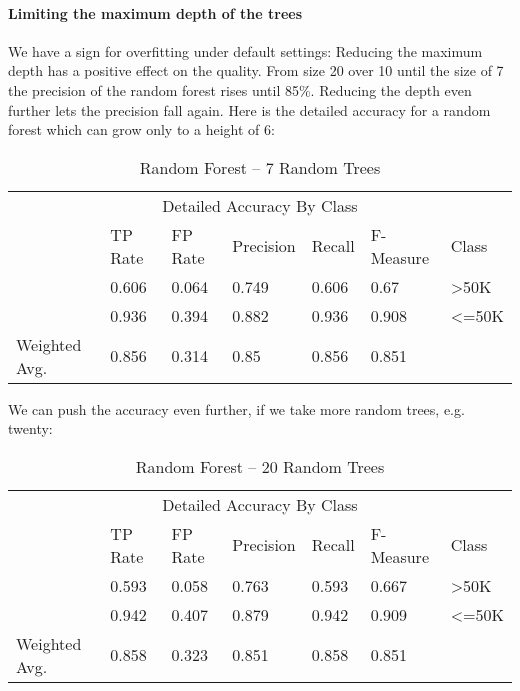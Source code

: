 \documentclass[paper=a4, fontsize=11pt]{scrartcl} %
\numberwithin{equation}{section} %
\numberwithin{figure}{section} %
\numberwithin{table}{section} %
\begin{document}
\paragraph{Limiting the maximum depth of the trees}
We have a sign for overfitting under default settings: Reducing the maximum depth has a positive effect on the quality. From size 20 over 10 until the size of 7 the precision of the random forest rises until 85\%. Reducing the depth even further lets the precision fall again. Here is the detailed accuracy for a random forest which can grow only to a height of 6:

\begin{table*}[htb]\centering
  \begin{tabular*}{\columnwidth}{@{}lllllll@{}}
      \toprule 
      \multicolumn{7}{c}{Detailed Accuracy By Class} \\ 
              &  TP Rate & FP Rate & Precision & Recall & F-Measure & Class    \\  \midrule
              &  0.606   & 0.064   & 0.749     & 0.606  & 0.67      & >50K     \\ 
              &  0.936   & 0.394   & 0.882     & 0.936  & 0.908     & <=50K    \\ 
Weighted Avg. &  0.856   & 0.314   & 0.85      & 0.856  & 0.851     &          \\  \bottomrule
    \end{tabular*}
\caption{Random Forest -- 7 Random Trees} 
\label{tab:adult:rand:7t}
\end{table*}
\FloatBarrier
We can push the accuracy even further, if we take more random trees, e.g. twenty:
\begin{table*}[htb]\centering
  \begin{tabular*}{\columnwidth}{@{}lllllll@{}}
      \toprule 
      \multicolumn{7}{c}{Detailed Accuracy By Class} \\ 
                & TP Rate  & FP Rate  & Precision &  Recall &  F-Measure  & Class  \\  \midrule          
                & 0.593    & 0.058    & 0.763     &  0.593  &  0.667      & >50K   \\     
                & 0.942    & 0.407    & 0.879     &  0.942  &  0.909      & <=50K  \\     
Weighted Avg.   & 0.858    & 0.323    & 0.851     &  0.858  &  0.851      &        \\  \bottomrule
    \end{tabular*}
\caption{Random Forest -- 20 Random Trees} 
\label{tab:adult:rand:20t}
\end{table*}
\FloatBarrier
\end{document}
